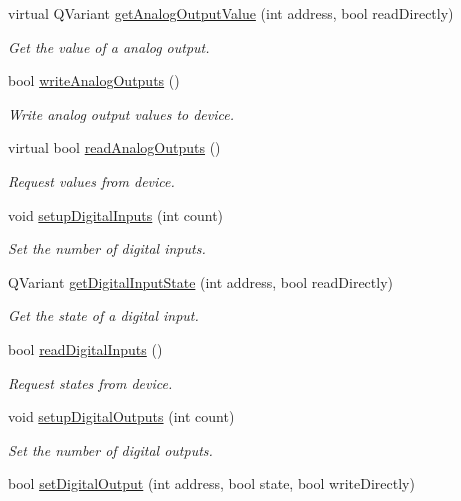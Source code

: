 \begin{DoxyCompactItemize}
virtual QVariant \hyperlink{classmdt_device_modbus_ae5b1fe86e7dca9a0229110ba81830648}{getAnalogOutputValue} (int address, bool readDirectly)
\begin{DoxyCompactList}\small\item\em Get the value of a analog output. \end{DoxyCompactList}\item 
bool \hyperlink{classmdt_device_modbus_aea63bdcba6d3acfce5eb28524b0dc6d2}{writeAnalogOutputs} ()
\begin{DoxyCompactList}\small\item\em Write analog output values to device. \end{DoxyCompactList}\item 
virtual bool \hyperlink{classmdt_device_modbus_a5d9dcf264581477901f598f770d9f5f3}{readAnalogOutputs} ()
\begin{DoxyCompactList}\small\item\em Request values from device. \end{DoxyCompactList}\item 
void \hyperlink{classmdt_device_modbus_a18a425c62e809d2f2940b1bba0ec521c}{setupDigitalInputs} (int count)
\begin{DoxyCompactList}\small\item\em Set the number of digital inputs. \end{DoxyCompactList}\item 
QVariant \hyperlink{classmdt_device_modbus_a467b1b7b17f80c410ff5fe5fa34bf0d2}{getDigitalInputState} (int address, bool readDirectly)
\begin{DoxyCompactList}\small\item\em Get the state of a digital input. \end{DoxyCompactList}\item 
bool \hyperlink{classmdt_device_modbus_a81cbcb4d10145d1bb9a8e0708ce4b74e}{readDigitalInputs} ()
\begin{DoxyCompactList}\small\item\em Request states from device. \end{DoxyCompactList}\item 
void \hyperlink{classmdt_device_modbus_af0eea185443f43cef5a3d9ed8d7a635e}{setupDigitalOutputs} (int count)
\begin{DoxyCompactList}\small\item\em Set the number of digital outputs. \end{DoxyCompactList}\item 
bool \hyperlink{classmdt_device_modbus_a42f6d4b2729c8e421895c6810e4cadf8}{setDigitalOutput} (int address, bool state, bool writeDirectly)

\end{DoxyCompactItemize}
